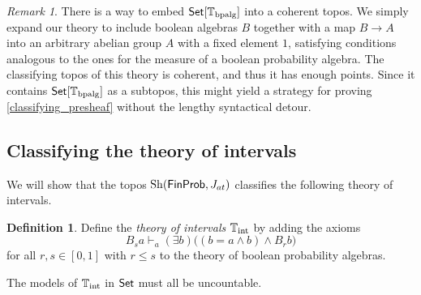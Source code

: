 \documentclass[a4paper]{amsproc}
\theoremstyle{plain}
\theoremstyle{definition}
\newtheorem{definition}[theorem]{Definition}
\theoremstyle{remark}
\newtheorem{remark}[theorem]{Remark}
\numberwithin{equation}{section}
\DeclareMathOperator{\Sh}{Sh}
\newcommand{\Set}{\textup{\textsf{Set}}}
\newcommand{\FinProb}{\textup{\textsf{FinProb}}}
\begin{document}
\begin{remark}
    There is a way to embed $\Set[\mathbb{T}_{\textup{bpalg}}]$ into a coherent topos. We simply expand our theory to include boolean algebras $B$ together with a map $B \to A$ into an arbitrary abelian group $A$ with a fixed element $1$, satisfying conditions analogous to the ones for the measure of a boolean probability algebra. The classifying topos of this theory is coherent, and thus it has enough points. Since it contains $\Set[\mathbb{T}_{\textup{bpalg}}]$ as a subtopos, this might yield a strategy for proving \ref{classifying_presheaf} without the lengthy syntactical detour.
\end{remark}

\subsection{Classifying the theory of intervals} \label{theory_of_intervals}

We will show that the topos $\Sh(\FinProb, J_{at})$ classifies the following theory of intervals.


\begin{definition}
    Define the \textit{theory of intervals} $\mathbb{T}_{\textup{int}}$ by adding the axioms
    \[
    B_s a \vdash_a (\exists b) \big ( (b = a \wedge b) \wedge B_r b \big )
    \]
    for all $r,s \in [0,1]$ with $r \leq s$ to the theory of boolean probability algebras.
\end{definition}

The models of $\mathbb{T}_{\textup{int}}$ in $\Set$ must all be uncountable.
\end{document}
